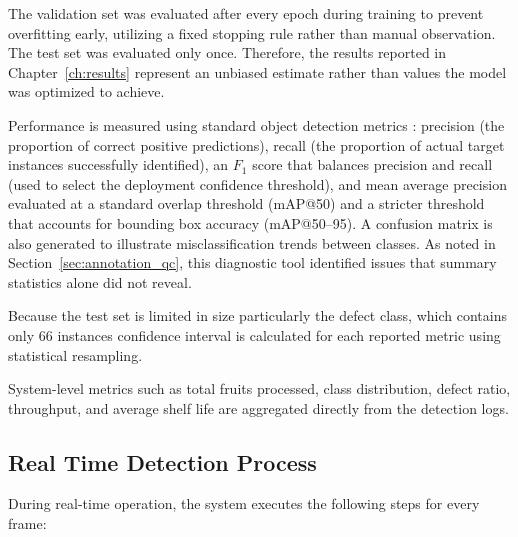 The validation set was evaluated after every epoch during training to prevent overfitting early, utilizing a fixed stopping rule rather than manual observation. The test set was evaluated only once. Therefore, the results reported in Chapter~\ref{ch:results} represent an unbiased estimate rather than values the model was optimized to achieve.

Performance is measured using standard object detection metrics \citep{padilla2020}: precision (the proportion of correct positive predictions), recall (the proportion of actual target instances successfully identified), an $F_1$ score that balances precision and recall (used to select the deployment confidence threshold), and mean average precision evaluated at a standard overlap threshold (mAP@50) and a stricter threshold that accounts for bounding box accuracy (mAP@50--95). A confusion matrix is also generated to illustrate misclassification trends between classes. As noted in Section~\ref{sec:annotation_qc}, this diagnostic tool identified issues that summary statistics alone did not reveal.

Because the test set is limited in size particularly the defect class, which contains only 66 instances confidence interval is calculated for each reported metric using statistical resampling. 

System-level metrics such as total fruits processed, class distribution, defect ratio, throughput, and average shelf life are aggregated directly from the detection logs.

\subsection{Real Time Detection Process}
\label{sec:m_realtime}

During real-time operation, the system executes the following steps for every frame:

